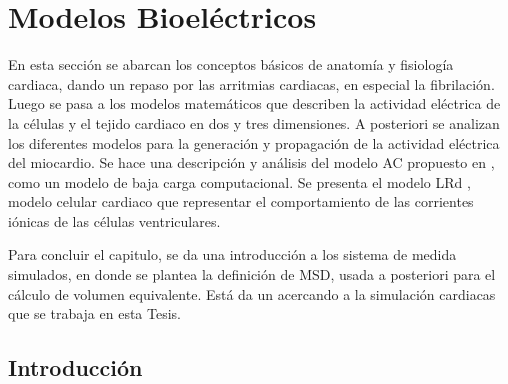 \chapter{Modelos Bioeléctricos}

\begin{resumen}
  En esta sección se abarcan los conceptos básicos de anatomía y fisiología cardiaca, dando un repaso por las arritmias cardiacas, en especial la fibrilación. Luego se pasa a los modelos matemáticos que describen la actividad eléctrica de la células y el tejido  cardiaco en dos y tres dimensiones.
  A posteriori se analizan los diferentes modelos para la generación y propagación de la actividad eléctrica del miocardio. Se hace una descripción y análisis del modelo \ac{AC} propuesto en \cite{Alonso-Atienza05},  como un
  modelo de baja carga computacional. Se presenta el modelo \ac{LRd} \cite{luo1994, livshitz2007}, modelo celular cardiaco que representar el comportamiento de las corrientes iónicas de las células ventriculares. 
  
  Para concluir el capitulo, se da una introducción a los sistema de medida simulados, en donde se plantea la definición de \ac{MSD}, usada a posteriori para el cálculo de volumen equivalente. Está da un acercando a la simulación cardiacas que se trabaja en esta Tesis.




\end{resumen}


\section{Introducción}

